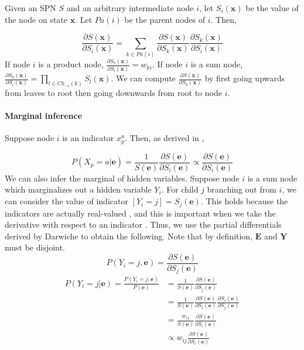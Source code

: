 \documentclass[10pt, titlepage]{article}
\theoremstyle{definition}
\newcommand\mb{\mathbf}
\begin{document}
Given an SPN $S$ and an arbitrary intermediate node $i$, let $S_i(\mb{x})$ be the value of the node on state $\mb{x}$. Let $Pa(i)$ be the parent nodes of $i$. Then,

\begin{equation}
\label{psx}
    \frac{\partial S(\mb{x})}{\partial S_i(\mb{x})}= \sum_{k\in Pa(i)}\frac{\partial S(\mb{x})}{\partial S_k(\mb{x})} \frac{\partial S_k(\mb{x})}{\partial S_i(\mb{x})}
\end{equation}
If node $i$ is a product node, $\frac{\partial S_k(\mb{x})}{\partial S_i(\mb{x})}=w_{ki}$. If node $i$ is a sum node, $\frac{\partial S_k(\mb{x})}{\partial S_i(\mb{x})}=\prod_{l\in Ch_{-i}(k)}S_l(\mb{x})$. We can compute $\frac{\partial S(\mb{x})}{\partial S_k(\mb{x})}$ by first going upwards from leaves to root then going downwards from root to node $i$. 

\paragraph{Marginal inference}\label{if:mg}
Suppose node $i$ is an indicator $x_p^a$. Then, as derived in \cite{darwiche2003differential},

\begin{equation}
P(X_p=a|\mb{e})=\frac{1}{S(\mb{e})}\frac{\partial S(\mb{e})}{\partial S_i(\mb{e})}\propto\frac{\partial S(\mb{e})}{\partial S_i(\mb{e})}
\end{equation}
We can also infer the marginal of hidden variables. Suppose node $i$ is a sum node which marginalizes out a hidden variable $Y_i$. For child $j$ branching out from $i$, we can consider the value of indicator $[Y_i=j] = S_j(\mb{e})$. This holds because the indicators are actually real-valued \cite{darwiche2003differential}\cite{peharz2015theoretical}, and this is important when we take the derivative with respect to an indicator \cite{peharz2015theoretical}. Thus, we use the partial differentials derived by Darwiche \cite{darwiche2003differential} to obtain the following. Note that by definition, $\mb{E}$ and $\mb{Y}$ must be disjoint.
\begin{equation}\label{eq:pyi}
P(Y_i=j, \mb{e})=\frac{\partial S(\mb{e})}{\partial S_j(\mb{e})}
\end{equation}
\begin{equation}
  \begin{aligned}
    P(Y_i=j|\mb{e})= \frac{P(Y_i=j, \mb{e})}{P(\mb{e})} &= \frac{1}{S(\mb{e})}\frac{\partial S(\mb{e})}{\partial S_j(\mb{e})}\\
    &= \frac{1}{S(\mb{e})}\frac{\partial S(\mb{e})}{\partial S_i(\mb{e})}\frac{\partial S_i(\mb{e})}{\partial S_j(\mb{e})}\\
    &=\frac{w_{ij}}{S(\mb{e})}\frac{\partial S(\mb{e})}{\partial S_i(\mb{e})}\\
    &\propto w_{ij}\frac{\partial S(\mb{e})}{\partial S_i(\mb{e})}
  \end{aligned}
\end{equation}
\end{document}
